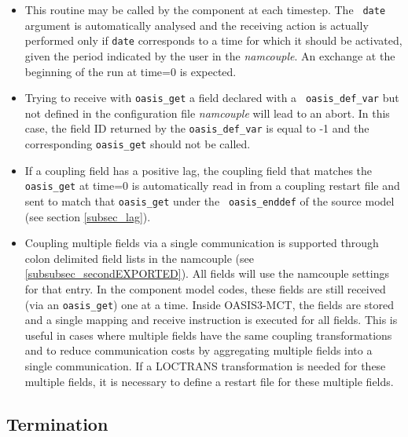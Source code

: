 \begin{itemize}

\item This routine may be called by the component at each timestep. The {\tt
  date} argument is automatically analysed and the receiving action is
actually performed only if {\tt date} corresponds to a time for which
it should be activated, given the period indicated by the user in the
{\it namcouple}. An exchange at the beginning of the run at time=0 is
expected.

\item Trying to receive with {\tt oasis\_get} a field declared with a {\tt
  oasis\_def\_var} but not defined in the configuration file {\it
  namcouple} will lead to an abort. In this case, the field ID
returned by the {\tt oasis\_def\_var} is equal to -1 and the
corresponding {\tt oasis\_get} should not be called. 

\item If a coupling field has a positive lag, the coupling field that
  matches the {\tt oasis\_get} at time=0 is automatically read in from a coupling
  restart file and sent to match that  {\tt oasis\_get} under the {\tt
    oasis\_enddef} of the source model (see section \ref{subsec_lag}). 

\item Coupling multiple fields via a single communication is supported
  through colon delimited field lists in the namcouple (see
  \ref{subsubsec_secondEXPORTED}).
All fields will use the namcouple settings for that entry. In the component
model codes, these fields are still received (via an {\tt oasis\_get}) one at a time. Inside
OASIS3-MCT, the fields are stored and a single mapping and receive instruction is executed
for all fields. This is useful in cases where multiple fields have the same coupling transformations
and to reduce communication costs by aggregating multiple fields into a single communication. If a
LOCTRANS transformation is needed for these multiple fields, it is necessary to define a restart file
for these multiple fields.
\end{itemize}

\subsection{Termination}
\label{subsubsec_Termination}

